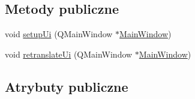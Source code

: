 \subsection*{Metody publiczne}
\begin{DoxyCompactItemize}
\item 
void \hyperlink{class_ui___main_window_acf4a0872c4c77d8f43a2ec66ed849b58}{setup\+Ui} (Q\+Main\+Window $\ast$\hyperlink{class_main_window}{Main\+Window})
\item 
void \hyperlink{class_ui___main_window_a097dd160c3534a204904cb374412c618}{retranslate\+Ui} (Q\+Main\+Window $\ast$\hyperlink{class_main_window}{Main\+Window})
\end{DoxyCompactItemize}
\subsection*{Atrybuty publiczne}
